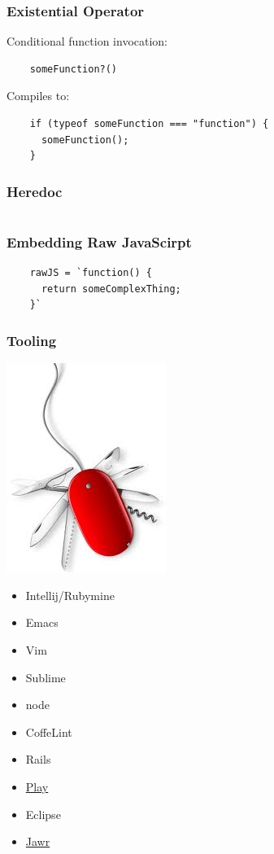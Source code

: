 \documentclass{beamer}
\begin{document}
 \begin{frame}[fragile]
  \frametitle{Existential Operator}

  Conditional function invocation:

  \begin{verbatim}
    someFunction?()
  \end{verbatim}

  Compiles to:

  \begin{verbatim}
    if (typeof someFunction === "function") {
      someFunction();
    }
  \end{verbatim}  
\end{frame}

\begin{frame}
  \frametitle{Heredoc}
  \inputminted{coffeescript}{src/heredoc.coffee}
\end{frame}

\begin{frame}[fragile]
  \frametitle{Embedding Raw JavaScirpt}
  \begin{verbatim}
    rawJS = `function() {
      return someComplexThing;
    }`
  \end{verbatim}
\end{frame}


\begin{frame}
  \frametitle{Tooling}
    \includegraphics[scale=.40]{tooling}
  \begin{multicols}{2}
  \begin{itemize}
    \item Intellij/Rubymine
    \item Emacs
    \item Vim
    \item Sublime
    \item node
    \item CoffeLint
    \item Rails
    \item \href{http://www.playframework.com/documentation/2.0/AssetsCoffeeScript}{Play}
    \item Eclipse
    \item \href{https://jawr.java.net/}{Jawr}

  \end{itemize}
\end{multicols}
\end{frame}
\end{document}

